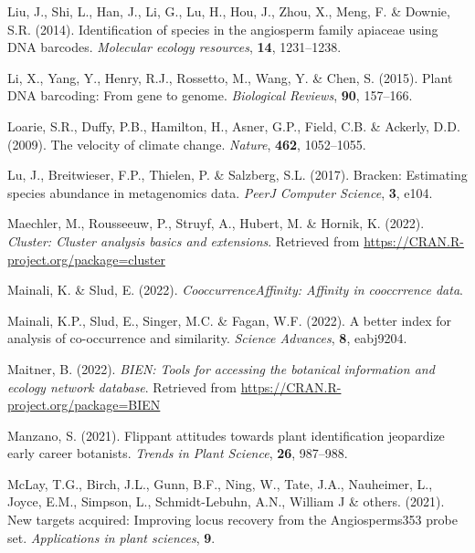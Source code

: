 \documentclass[
]{article}
\newlength{\cslhangindent}
\newlength{\cslentryspacingunit} %
\newenvironment{CSLReferences}[2] %
 {%
  \setlength{\parindent}{0pt}
  \ifodd #1
  \let\oldpar\par
  \def\par{\hangindent=\cslhangindent\oldpar}
  \fi
  \setlength{\parskip}{#2\cslentryspacingunit}
 }%
 {}
\begin{document}
\begin{CSLReferences}{1}{0}
\leavevmode{}%
Liu, J., Shi, L., Han, J., Li, G., Lu, H., Hou, J., Zhou, X., Meng, F.
\& Downie, S.R. (2014). Identification of species in the angiosperm
family apiaceae using DNA barcodes. \emph{Molecular ecology resources},
\textbf{14}, 1231--1238.

\leavevmode{}%
Li, X., Yang, Y., Henry, R.J., Rossetto, M., Wang, Y. \& Chen, S.
(2015). Plant DNA barcoding: From gene to genome. \emph{Biological
Reviews}, \textbf{90}, 157--166.

\leavevmode{}%
Loarie, S.R., Duffy, P.B., Hamilton, H., Asner, G.P., Field, C.B. \&
Ackerly, D.D. (2009). The velocity of climate change. \emph{Nature},
\textbf{462}, 1052--1055.

\leavevmode{}%
Lu, J., Breitwieser, F.P., Thielen, P. \& Salzberg, S.L. (2017).
Bracken: Estimating species abundance in metagenomics data. \emph{PeerJ
Computer Science}, \textbf{3}, e104.

\leavevmode{}%
Maechler, M., Rousseeuw, P., Struyf, A., Hubert, M. \& Hornik, K.
(2022). \emph{Cluster: Cluster analysis basics and extensions}.
Retrieved from \url{https://CRAN.R-project.org/package=cluster}

\leavevmode{}%
Mainali, K. \& Slud, E. (2022). \emph{CooccurrenceAffinity: Affinity in
cooccrrence data}.

\leavevmode{}%
Mainali, K.P., Slud, E., Singer, M.C. \& Fagan, W.F. (2022). A better
index for analysis of co-occurrence and similarity. \emph{Science
Advances}, \textbf{8}, eabj9204.

\leavevmode{}%
Maitner, B. (2022). \emph{BIEN: Tools for accessing the botanical
information and ecology network database}. Retrieved from
\url{https://CRAN.R-project.org/package=BIEN}

\leavevmode{}%
Manzano, S. (2021). Flippant attitudes towards plant identification
jeopardize early career botanists. \emph{Trends in Plant Science},
\textbf{26}, 987--988.

\leavevmode{}%
McLay, T.G., Birch, J.L., Gunn, B.F., Ning, W., Tate, J.A., Nauheimer,
L., Joyce, E.M., Simpson, L., Schmidt-Lebuhn, A.N., William J \& others.
(2021). New targets acquired: Improving locus recovery from the
Angiosperms353 probe set. \emph{Applications in plant sciences},
\textbf{9}.


\end{CSLReferences}
\end{document}
